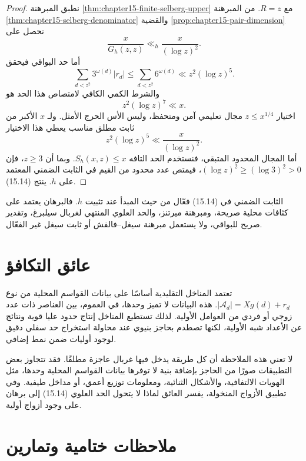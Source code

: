 \begin{proof}
نطبق المبرهنة \ref{thm:chapter15-finite-selberg-upper} مع \(R=z\). من
المبرهنة \ref{thm:chapter15-selberg-denominator} والقضية
\ref{prop:chapter15-pair-dimension} نحصل على
\[
\frac{x}{G_h(z,z)}\ll_h \frac{x}{(\log z)^2}.
\]
أما حد البواقي فيحقق
\[
\sum_{d<z^2}3^{\omega(d)}|r_d|
\le
\sum_{d<z^2}6^{\omega(d)}
\ll z^2(\log z)^5.
\]
والشرط الكمي الكافي لامتصاص هذا الحد هو
\[
z^2(\log z)^7\ll x.
\]
اختيار \(z\le x^{1/4}\) مجال تعليمي آمن ومتحفظ، وليس الأس الحرج الأمثل. ولـ
\(x\) الأكبر من ثابت مطلق مناسب يعطي هذا الاختيار
\[
z^2(\log z)^5
\ll
\frac{x}{(\log z)^2}.
\]
أما المجال المحدود المتبقي، فنستخدم الحد التافه \(S_h(x,z)\le x\). وبما أن
\(z\ge3\)، فإن \((\log z)^2\ge(\log3)^2>0\)، فيمتص عدد محدود من القيم في
الثابت الضمني المعتمد على \(h\). ينتج (15.14).
\end{proof}
\begin{remark}
الثابت الضمني في (15.14) فعّال من حيث المبدأ عند تثبيت \(h\). فالبرهان يعتمد
على كثافات محلية صريحة، ومبرهنة ميرتنز، والحد العلوي المنتهي لغربال سيلبرغ،
وتقدير صريح للبواقي، ولا يستعمل مبرهنة سيغل--فالفش أو ثابت سيغل غير الفعّال.
\end{remark}
\section{عائق التكافؤ}

\begin{remark}
\label{rem:chapter15-parity-barrier}
تعتمد المناخل التقليدية أساسًا على بيانات القواسم المحلية من نوع
\(|\mathcal A_d|=Xg(d)+r_d\). هذه البيانات لا تميز وحدها، في العموم، بين
العناصر ذات عدد زوجي أو فردي من العوامل الأولية. لذلك تستطيع المناخل إنتاج
حدود عليا قوية ونتائج عن الأعداد شبه الأولية، لكنها تصطدم بحاجز بنيوي عند
محاولة استخراج حد سفلي دقيق لوجود أوليات ضمن نمط إضافي.
\end{remark}

لا تعني هذه الملاحظة أن كل طريقة يدخل فيها غربال عاجزة مطلقًا. فقد تتجاوز
بعض التطبيقات صورًا من الحاجز بإضافة بنية لا توفرها بيانات القواسم المحلية
وحدها، مثل الهويات الالتفافية، والأشكال الثنائية، ومعلومات توزيع أعمق، أو
مداخل طيفية. وفي تطبيق الأزواج المنخولة، يفسر العائق لماذا لا يتحول الحد
العلوي (15.14) إلى برهان على وجود أزواج أولية.

\section{ملاحظات ختامية وتمارين}

